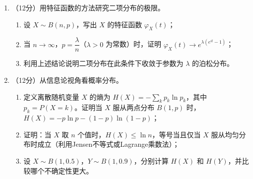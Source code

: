 \documentclass[12pt, a4paper]{ctexart}
\begin{document}
\begin{enumerate}[resume]
\begin{enumerate}[label=(\arabic*)]
    \item 求边缘分布列 $P(X=0)$，$P(X=1)$；
    \item 判断 $X$ 与 $Y$ 是否独立，并说明理由；
    \item 求 $\text{Cov}(X,Y)$ 和相关系数 $\rho_{XY}$。
\end{enumerate}

\item （12分）用特征函数的方法研究二项分布的极限。

\begin{enumerate}[label=(\arabic*)]
    \item 设 $X\sim B(n,p)$，写出 $X$ 的特征函数 $\varphi_X(t)$；
    \item 当 $n\to\infty$，$p=\dfrac{\lambda}{n}$（$\lambda>0$ 为常数）时，证明 $\varphi_X(t)\to e^{\lambda(e^{it}-1)}$；
    \item 利用上述结论说明二项分布在此条件下收敛于参数为 $\lambda$ 的泊松分布。
\end{enumerate}

\item （12分）从信息论视角看概率分布。

\begin{enumerate}[label=(\arabic*)]
    \item 定义离散随机变量 $X$ 的熵为 $H(X)=-\displaystyle\sum_{k}p_k\ln p_k$，其中 $p_k=P(X=k)$。证明当 $X$ 服从两点分布 $B(1,p)$ 时，$H(X)=-p\ln p-(1-p)\ln(1-p)$；
    \item 证明：当 $X$ 取 $n$ 个值时，$H(X)\leq \ln n$，等号当且仅当 $X$ 服从均匀分布时成立（利用Jensen不等式或Lagrange乘数法）；
    \item 设 $X\sim B(1,0.5)$，$Y\sim B(1,0.9)$，分别计算 $H(X)$ 和 $H(Y)$，并比较哪个不确定性更大。
\end{enumerate}

\end{enumerate}
\end{document}

